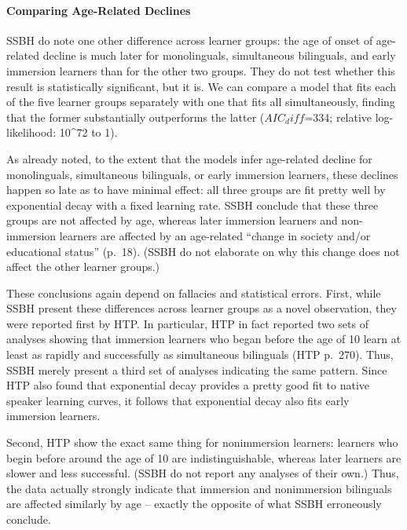 \documentclass[
  english,
  doc,floatsintext]{apa6}
\let\oldparagraph\paragraph
\renewcommand{\paragraph}[1]{\oldparagraph{#1}\mbox{}}
\begin{document}
\hypertarget{comparing-age-related-declines}{%
\paragraph{Comparing Age-Related Declines}\label{comparing-age-related-declines}}

SSBH do note one other difference across learner groups: the age of onset of age-related decline is much later for monolinguals, simultaneous bilinguals, and early immersion learners than for the other two groups. They do not test whether this result is statistically significant, but it is. We can compare a model that fits each of the five learner groups separately with one that fits all simultaneously, finding that the former substantially outperforms the latter (\(AIC_diff\)=334; relative log-likelihood: 10\^{}72 to 1).

As already noted, to the extent that the models infer age-related decline for monolinguals, simultaneous bilinguals, or early immersion learners, these declines happen so late as to have minimal effect: all three groups are fit pretty well by exponential decay with a fixed learning rate. SSBH conclude that these three groups are not affected by age, whereas later immersion learners and non-immersion learners are affected by an age-related ``change in society and/or educational status'' (p.~18). (SSBH do not elaborate on why this change does not affect the other learner groups.)

These conclusions again depend on fallacies and statistical errors. First, while SSBH present these differences across learner groups as a novel observation, they were reported first by HTP. In particular, HTP in fact reported two sets of analyses showing that immersion learners who began before the age of 10 learn at least as rapidly and successfully as simultaneous bilinguals (HTP p.~270). Thus, SSBH merely present a third set of analyses indicating the same pattern. Since HTP also found that exponential decay provides a pretty good fit to native speaker learning curves, it follows that exponential decay also fits early immersion learners.

Second, HTP show the exact same thing for nonimmersion learners: learners who begin before around the age of 10 are indistinguishable, whereas later learners are slower and less successful. (SSBH do not report any analyses of their own.) Thus, the data actually strongly indicate that immersion and nonimmersion bilinguals are affected similarly by age -- exactly the opposite of what SSBH erroneously conclude.
\end{document}
